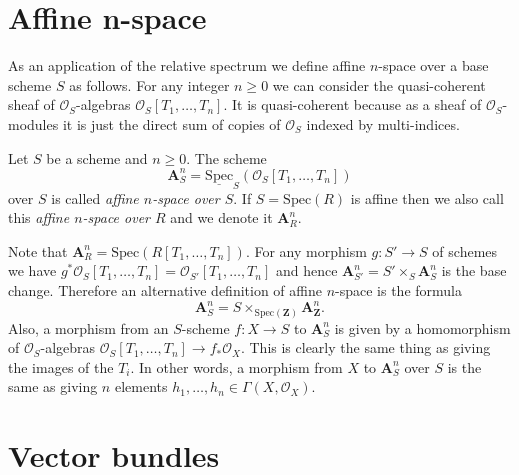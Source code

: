 \section{Affine n-space}
\label{section-affine-n-space}

\noindent
As an application of the relative spectrum
we define affine $n$-space over a base scheme
$S$ as follows. For any integer $n \geq 0$ we can consider the
quasi-coherent sheaf of $\mathcal{O}_S$-algebras
$\mathcal{O}_S[T_1, \ldots, T_n]$. It is quasi-coherent because
as a sheaf of $\mathcal{O}_S$-modules it is just the direct sum
of copies of $\mathcal{O}_S$ indexed by multi-indices.

\begin{definition}
\label{definition-affine-n-space}
Let $S$ be a scheme and $n \geq 0$.
The scheme
$$
\mathbf{A}^n_S =
\underline{\text{Spec}}_S(\mathcal{O}_S[T_1, \ldots, T_n])
$$
over $S$ is called {\it affine $n$-space over $S$}.
If $S = \text{Spec}(R)$ is affine then we also call this
{\it affine $n$-space over $R$} and we denote it $\mathbf{A}^n_R$.
\end{definition}

\noindent
Note that $\mathbf{A}^n_R = \text{Spec}(R[T_1, \ldots, T_n])$.
For any morphism $g : S' \to S$ of schemes we have
$g^*\mathcal{O}_S[T_1, \ldots, T_n] = \mathcal{O}_{S'}[T_1, \ldots, T_n]$
and hence $\mathbf{A}^n_{S'} = S' \times_S \mathbf{A}^n_S$ is the base
change. Therefore an alternative definition of affine $n$-space
is the formula
$$
\mathbf{A}^n_S = S \times_{\text{Spec}(\mathbf{Z})} \mathbf{A}^n_{\mathbf{Z}}.
$$
Also, a morphism from an $S$-scheme $f : X \to S$
to $\mathbf{A}^n_S$ is given by a homomorphism of 
$\mathcal{O}_S$-algebras
$\mathcal{O}_S[T_1, \ldots, T_n] \to f_*\mathcal{O}_X$.
This is clearly the same thing as giving the images of the $T_i$.
In other words, a morphism from $X$ to $\mathbf{A}^n_S$ over $S$
is the same as giving $n$ elements
$h_1, \ldots, h_n \in \Gamma(X, \mathcal{O}_X)$.

















\section{Vector bundles}
\label{section-vector-bundle}

